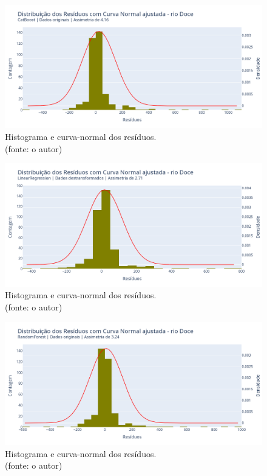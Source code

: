\begin{figure}[!h]
	\centering
	\includegraphics[scale=0.33]{Figuras/rio_doce/wfv/CB/CB_WFV_ORIG_RESID_x_CURVA_NORMAL.png}
	\caption{Histograma e curva-normal dos resíduos.\\(fonte: o autor)}
	\label{fig:doce_CB_WFV_ORIG_RESID_x_CURVA_NORMAL}
\end{figure}

\begin{figure}[!h]
	\centering
	\includegraphics[scale=0.33]{Figuras/rio_doce/wfv/LR/LR_WFV_LOG_RESID_x_CURVA_NORMAL.png}
	\caption{Histograma e curva-normal dos resíduos.\\(fonte: o autor)}
	\label{fig:doce_LR_WFV_LOG_RESID_x_CURVA_NORMAL}
\end{figure}

\begin{figure}[!h]
	\centering
	\includegraphics[scale=0.33]{Figuras/rio_doce/wfv/RF/RF_WFV_ORIG_RESID_x_CURVA_NORMAL.png}
	\caption{Histograma e curva-normal dos resíduos.\\(fonte: o autor)}
	\label{fig:doce_RF_WFV_ORIG_RESID_x_CURVA_NORMAL}
\end{figure}
\clearpage


